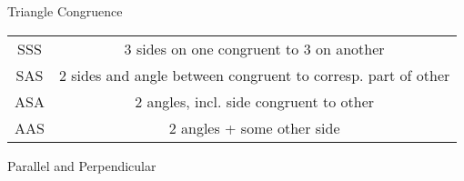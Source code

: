 \documentclass{article}
\begin{document}
Triangle Congruence
\begin{tabular}{c | c}
  SSS & 3 sides on one congruent to 3 on another\\
  SAS & 2 sides and angle between congruent to corresp. part of other\\
  ASA & 2 angles, incl. side congruent to other\\
  AAS & 2 angles + some other side
\end{tabular}

Parallel and Perpendicular
\begin{tabular}{c | c}
\end{tabular}
\end{document}
